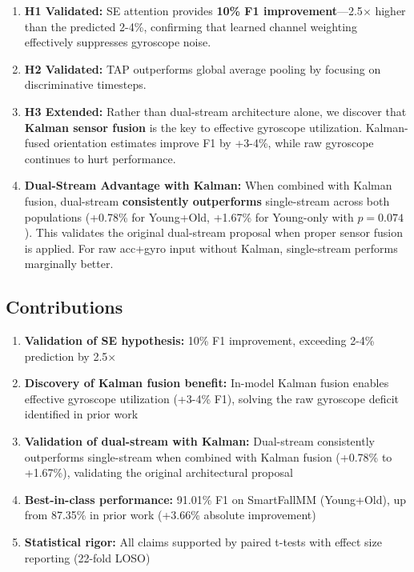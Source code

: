 \documentclass{article}
\begin{document}
\begin{enumerate}
    \item \textbf{H1 Validated:} SE attention provides \textbf{10\% F1 improvement}---2.5$\times$ higher than the predicted 2-4\%, confirming that learned channel weighting effectively suppresses gyroscope noise.

    \item \textbf{H2 Validated:} TAP outperforms global average pooling by focusing on discriminative timesteps.

    \item \textbf{H3 Extended:} Rather than dual-stream architecture alone, we discover that \textbf{Kalman sensor fusion} is the key to effective gyroscope utilization. Kalman-fused orientation estimates improve F1 by +3-4\%, while raw gyroscope continues to hurt performance.

    \item \textbf{Dual-Stream Advantage with Kalman:} When combined with Kalman fusion, dual-stream \textbf{consistently outperforms} single-stream across both populations (+0.78\% for Young+Old, +1.67\% for Young-only with $p=0.074$). This validates the original dual-stream proposal when proper sensor fusion is applied. For raw acc+gyro input without Kalman, single-stream performs marginally better.
\end{enumerate}

\subsection{Contributions}

\begin{enumerate}
    \item \textbf{Validation of SE hypothesis:} 10\% F1 improvement, exceeding 2-4\% prediction by 2.5$\times$
    \item \textbf{Discovery of Kalman fusion benefit:} In-model Kalman fusion enables effective gyroscope utilization (+3-4\% F1), solving the raw gyroscope deficit identified in prior work
    \item \textbf{Validation of dual-stream with Kalman:} Dual-stream consistently outperforms single-stream when combined with Kalman fusion (+0.78\% to +1.67\%), validating the original architectural proposal
    \item \textbf{Best-in-class performance:} 91.01\% F1 on SmartFallMM (Young+Old), up from 87.35\% in prior work (+3.66\% absolute improvement)
    \item \textbf{Statistical rigor:} All claims supported by paired t-tests with effect size reporting (22-fold LOSO)
\end{enumerate}
\end{document}

